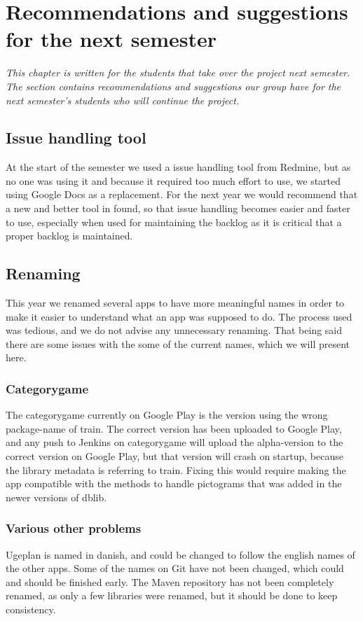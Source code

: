 \chapter{Recommendations and suggestions for the next semester}
\textit{This chapter is written for the students that take over the project next semester. The section contains recommendations and suggestions our group have for the next semester’s students who will continue the project.}

\section{Issue handling tool}
At the start of the semester we used a issue handling tool from Redmine, but as no one was using it and because it required too much effort to use, we started using Google Docs as a replacement. For the next year we would recommend that a new and better tool in found, so that issue handling becomes easier and faster to use, especially when used for maintaining the backlog as it is critical that a proper backlog is maintained.

\section{Renaming}
This year we renamed several apps to have more meaningful names in order to make it easier to understand what an app was supposed to do. The process used was tedious, and we do not advise any unnecessary renaming. That being said there are some issues with the some of the current names, which we will present here.

\subsection{Categorygame}
The categorygame currently on Google Play is the version using the wrong package-name of train. The correct version has been uploaded to Google Play, and any push to Jenkins on categorygame will upload the alpha-version to the correct version on Google Play, but that version will crash on startup, because the library metadata is referring to train. Fixing this would require making the app compatible with the methods to handle pictograms that was added in the newer versions of dblib.

\subsection{Various other problems}
Ugeplan is named in danish, and could be changed to follow the english names of the other apps.
Some of the names on Git have not been changed, which could and should be finished early.
The Maven repository has not been completely renamed, as only a few libraries were renamed, but it should be done to keep consistency.

